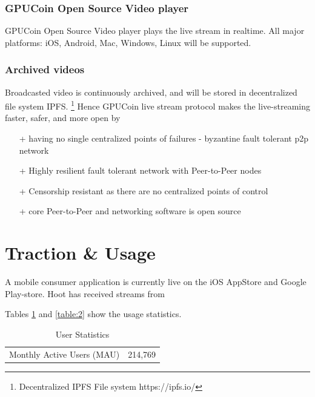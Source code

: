 \documentclass{article}
\begin{document}
\subsubsection{GPUCoin Open Source Video player}
GPUCoin Open Source Video player plays the live stream in realtime. All major platforms: iOS, Android, Mac, Windows, Linux will be supported.

\subsubsection{Archived videos}
Broadcasted video is continuously archived, and will be stored in decentralized file system IPFS. \footnote{Decentralized IPFS File system https://ipfs.io/} Hence GPUCoin live stream protocol makes the live-streaming faster, safer, and more open by
\begin{itemize}
 \item[+]having no single centralized points of failures - byzantine fault tolerant p2p network
 \item[+]Highly resilient fault tolerant network with Peer-to-Peer nodes
 \item[+]Censorship resistant as there are no centralized points of control
 \item[+]core Peer-to-Peer and networking software is open source
\end{itemize}


 
\section{Traction \& Usage}
A mobile consumer application is currently live on the iOS AppStore and Google Play-store. Hoot has received streams from 


Tables \ref{table:1} and \ref{table:2} show the usage statistics.

\setlength{\arrayrulewidth}{.7mm}
\setlength{\tabcolsep}{18pt}
\renewcommand{\arraystretch}{2.0} 
 


\begin{table}[!htb]
\centering
\begin{tabular}{ |c|c| }
\hline
\rowcolor{lightgray} \multicolumn{2}{|c|}{User Statistics} \\
\hline
Monthly Active Users (MAU) & 214,769 \\
\hline
\end{tabular}
\caption{User Statistics}
\label{table:1}
\end{table}
\end{document}
